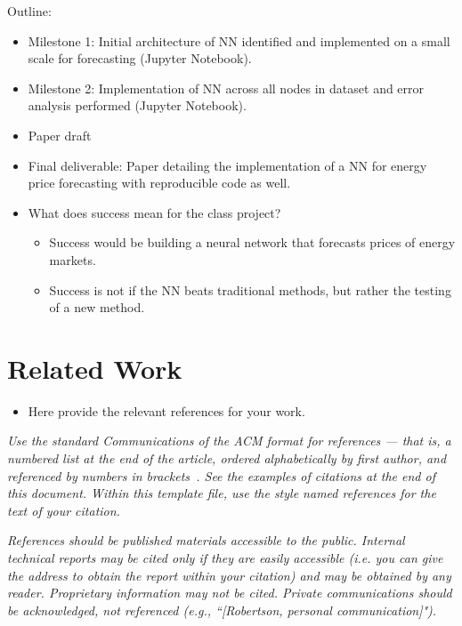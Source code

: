 \documentclass[sigconf]{acmart}
\begin{document}
Outline:
\begin{itemize}
    	\item Milestone 1: Initial architecture of NN identified and implemented on a small scale for forecasting (Jupyter Notebook).
    	\item Milestone 2: Implementation of NN across all nodes in dataset and error analysis performed (Jupyter Notebook).
	\item Paper draft 
	\item Final deliverable: Paper detailing the implementation of a NN for energy price forecasting with reproducible code as well. 
   	\item What does success mean for the class project?
	\begin{itemize}
		\item Success would be building a neural network that forecasts prices of energy markets. 
		\item Success is not if the NN beats traditional methods, but rather the testing of a new method. 
	\end{itemize}
\end{itemize}


\section{Related Work}
\begin{itemize}
    \item Here provide the relevant references for your work. 
\end{itemize}
	
\emph{Use the standard Communications of the ACM format for references --- that is, a numbered list at the end of the article, ordered alphabetically by first author, and referenced by numbers in brackets~. See the examples of citations at the end of this document. Within this template file, use the style named references for the text of your citation.}

\emph{References should be published materials accessible to the public. Internal technical reports may be cited only if they are easily accessible (i.e. you can give the address to obtain the report within your citation) and may be obtained by any reader. Proprietary information may not be cited. Private communications should be acknowledged, not referenced  (e.g., ``[Robertson, personal communication]").}



%

\end{document}
